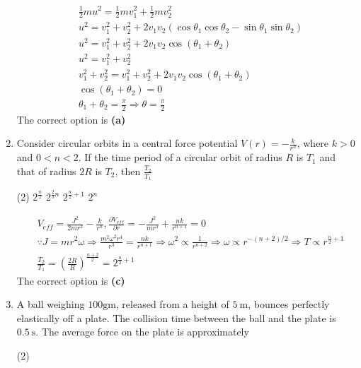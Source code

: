\begin{enumerate}
\begin{answer}
\begin{align*}
&\frac{1}{2} m u^{2}=\frac{1}{2} m v_{1}^{2}+\frac{1}{2} m v_{2}^{2}\\
	&u^{2}=v_{1}^{2}+v_{2}^{2}+2 v_{1} v_{2}\left(\cos \theta_{1} \cos \theta_{2}-\sin \theta_{1} \sin \theta_{2}\right) \\
	&u^{2}=v_{1}^{2}+v_{2}^{2}+2 v_{1} v_{2} \cos \left(\theta_{1}+\theta_{2}\right) \\
	&u^{2}=v_{1}^{2}+v_{2}^{2} \\
	&v_{1}^{2}+v_{2}^{2}=v_{1}^{2}+v_{2}^{2}+2 v_{1} v_{2} \cos \left(\theta_{1}+\theta_{2}\right) \\
	&\cos \left(\theta_{1}+\theta_{2}\right)=0 \\
	&\theta_{1}+\theta_{2}=\frac{\pi}{2} \Rightarrow \theta=\frac{\pi}{2}
\end{align*}
The correct option is \textbf{(a)}	
\end{answer}
	\item Consider circular orbits in a central force potential $V(r)=-\frac{k}{r^{n}}$, where $k>0$ and $0<n<2$. If the time period of a circular orbit of radius $R$ is $T_{1}$ and that of radius $2 R$ is $T_{2}$, then $\frac{T_{2}}{T_{1}}$
	{}
\begin{tasks}(2)
	\task[\textbf{A.}] $2^{\frac{n}{2}}$
	\task[\textbf{B.}]$2^{\frac{2}{3} n}$
	\task[\textbf{C.}]$2^{\frac{n}{2}+1}$
	\task[\textbf{D.}]$2^{n}$
\end{tasks}
\begin{answer}
	\begin{align*}
		&V_{e f f}=\frac{J^{2}}{2 m r^{2}}-\frac{k}{r^{n}}, \frac{\partial V_{e f f}}{\partial r}=-\frac{J^{2}}{m r^{3}}+\frac{n k}{r^{n+1}}=0\\
		&\because J=m r^{2} \omega \Rightarrow \frac{m^{2} \omega^{2} r^{4}}{r^{3}}=\frac{n k}{r^{n+1}} \Rightarrow \omega^{2} \propto \frac{1}{r^{n+2}} \Rightarrow \omega \propto r^{-(n+2) / 2} \Rightarrow T \propto r^{\frac{n}{2}+1} \\
		&\frac{T_{2}}{T_{1}}=\left(\frac{2 R}{R}\right)^{\frac{n+2}{2}}=2^{\frac{n}{2}+1}
	\end{align*}
	The correct option is \textbf{(c)}
\end{answer}
	\item A ball weighing $100 \mathrm{gm}$, released from a height of $5 \mathrm{~m}$, bounces perfectly elastically off a plate. The collision time between the ball and the plate is $0.5 \mathrm{~s}$. The average force on the plate is approximately
{	}
\begin{tasks}(2)

\end{tasks}
\end{enumerate}
